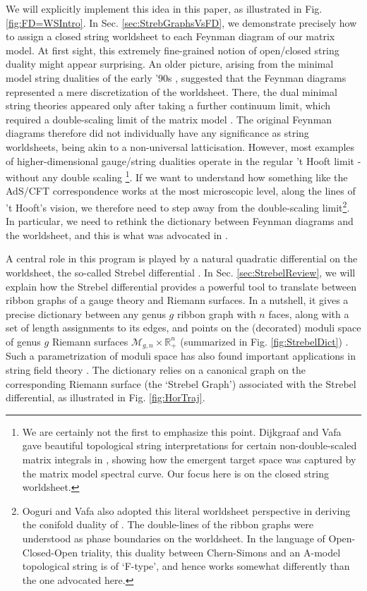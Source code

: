 \documentclass[english]{article}
\renewcommand{\>}{\rangle}
\newcommand{\<}{\langle}
\renewcommand{\(}{\left(}
\renewcommand{\)}{\right)}
\begin{document}
We will explicitly implement this idea in this paper, as illustrated in Fig. \ref{fig:FD=WSIntro}. In Sec. \ref{sec:StrebGraphsVsFD}, we demonstrate precisely how to assign a closed string worldsheet to each Feynman diagram of our matrix model. At first sight, this extremely fine-grained notion of open/closed string duality might appear surprising. An older picture, arising from the minimal model string dualities of the early '90s \cite{gross-migdal,brezin1990exactly,douglas1990strings}, suggested that the Feynman diagrams represented a mere discretization of the worldsheet. There, the dual minimal string theories appeared only after taking a further continuum limit, which required a double-scaling limit of the matrix model \cite{DavidDiscretizedWS,klebanov1991string, ginsparg1993lectures}. The original Feynman diagrams therefore did not individually have any significance as string worldsheets, being akin to a non-universal latticisation. However, most examples of higher-dimensional gauge/string dualities operate in the regular 't Hooft limit - without any double scaling \footnote{We are certainly not the first to emphasize this point. Dijkgraaf and Vafa gave beautiful topological string interpretations for certain non-double-scaled matrix integrals in  \cite{DijkgraafVafa02}, showing how the emergent target space was captured by the matrix model spectral curve. Our focus here is on the closed string worldsheet.}. If we want to understand how something like the AdS/CFT correspondence works at the most microscopic level, along the lines of 't Hooft's vision, we therefore need to step away from the double-scaling limit\footnote{Ooguri and Vafa \cite{OV2002worldsheet} also adopted this literal worldsheet perspective in deriving the conifold duality of \cite{GV98,GV99}. The double-lines of the ribbon graphs were understood as phase boundaries on the worldsheet. In the language of Open-Closed-Open triality, this duality between Chern-Simons and an A-model topological string is of `F-type', and hence works somewhat differently than the one advocated here. }. In particular, we need to rethink the dictionary between Feynman diagrams and the worldsheet, and this is what was advocated in \cite{freefieldsadsI,freefieldsadsII,freefieldsIII}. 


A central role in this program is played by a natural quadratic differential on the worldsheet, the so-called Strebel differential \cite{freefieldsIII}. In Sec. \ref{sec:StrebelReview}, we will explain how the Strebel differential provides a powerful tool to translate between ribbon graphs of a gauge theory and Riemann surfaces. In a nutshell, it gives a precise dictionary between any genus $g$ ribbon graph with $n$ faces, along with a set of length assignments to its edges, and points on the (decorated) moduli space of genus $g$ Riemann surfaces $\mathcal{M}_{g,n} \times \mathbb{R}_{+}^{n}$ (summarized in Fig. \ref{fig:StrebelDict}) \cite{strebel1984, KontsevichAiry, harer1988cohomology, mukhireview}. Such a parametrization of moduli space has also found important applications in string field theory \cite{ZwiebachProof, WittenOSFT, Atakan}. The dictionary relies on a canonical graph on the corresponding Riemann surface (the `Strebel Graph') associated with the Strebel differential, as illustrated in Fig. \ref{fig:HorTraj}. 
\end{document}
